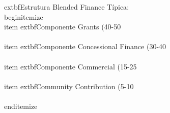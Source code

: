 \documentclass[12pt, a4paper]{article}
\begin{document}
{{{{{{{{{{{	extbf{Estrutura Blended Finance Típica}:
\\begin{itemize}
\\item 	extbf{Componente Grants} (40-50\\%
\\item 	extbf{Componente Concessional Finance} (30-40\\%
\\item 	extbf{Componente Commercial} (15-25\\%
\\item 	extbf{Community Contribution} (5-10\\%
\\end{itemize}

}}}}}}}}}}}
\end{document}

